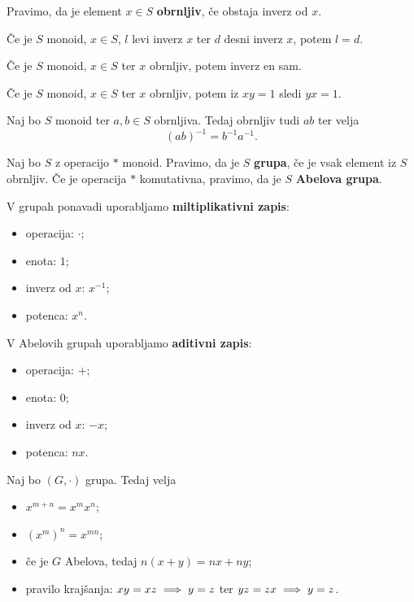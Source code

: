 \begin{definicija}
    Pravimo, da je element $x \in S$ \textbf{obrnljiv}, če obstaja inverz od $x$.
\end{definicija}

\begin{trditev}
    Če je $S$ monoid, $x \in S$, $l$ levi inverz $x$ ter $d$ desni inverz $x$, potem $l=d$.
\end{trditev}

\begin{posledica}
    Če je $S$ monoid, $x \in S$ ter \(x\) obrnljiv, potem inverz en sam.
\end{posledica}

\begin{posledica}
    Če je $S$ monoid, $x \in S$ ter \(x\) obrnljiv, potem iz \(x y = 1\) sledi \(yx = 1\).
\end{posledica}

\begin{trditev}
    Naj bo \(S\) monoid ter \(a, b \in S\) obrnljiva. Tedaj obrnljiv tudi \(ab\) ter velja \[(ab)^{-1} = b^{-1}a^{-1}.\]
\end{trditev}

\begin{definicija}
    Naj bo $S$ z operacijo $*$ monoid. Pravimo, da je $S$ \textbf{grupa}, če je vsak element iz $S$ obrnljiv.
    Če je operacija $*$ komutativna, pravimo, da je $S$ \textbf{Abelova grupa}.
\end{definicija}

V grupah ponavadi uporabljamo \textbf{miltiplikativni zapis}:
\begin{itemize}
    \item operacija: $\cdot$;
    \item enota: $1$;
    \item inverz od $x$: $x^{-1}$;
    \item potenca: $x^n$.
\end{itemize}

V Abelovih grupah uporabljamo \textbf{aditivni zapis}: 
\begin{itemize}
    \item operacija: $+$;
    \item enota: $0$;
    \item inverz od $x$: $-x$;
    \item potenca: $nx$.
\end{itemize}

\newpage
\begin{trditev}
    Naj bo \((G, \cdot)\) grupa. Tedaj velja
    \begin{itemize}
        \item \(x^{m + n} = x^m x^n\);
        \item \((x^m)^n = x^{mn}\);
        \item če je \(G\) Abelova, tedaj \(n(x+y) = nx + ny\);
        \item pravilo krajšanja: \(xy = xz \implies y = z\) ter \(yz = zx \implies y = z\).
    \end{itemize}
\end{trditev}

